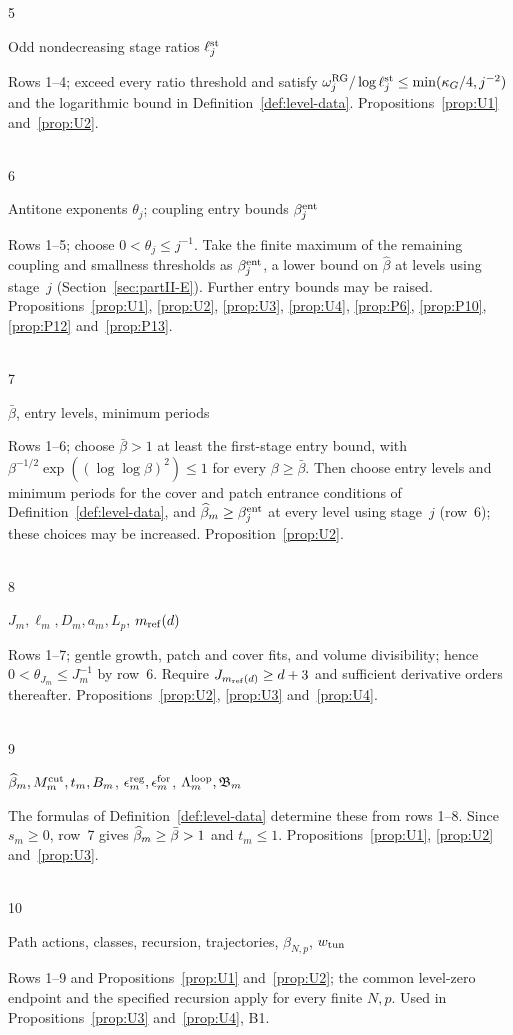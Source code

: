 \begin{tabbing}
5\>\parbox[t]{0.26\linewidth}{\raggedright Odd nondecreasing stage ratios $\ell_j^{\rm st}$}\>\parbox[t]{0.67\linewidth}{\raggedright Rows 1--4; exceed every ratio threshold and satisfy $\omega_j^{\rm RG}/\log\ell_j^{\rm st}\le\min(\kappa_G/4,j^{-2})$ and the logarithmic bound in Definition~\ref{def:level-data}. Propositions~\ref{prop:U1} and~\ref{prop:U2}.}\\[0.45em]
6\>\parbox[t]{0.26\linewidth}{\raggedright Antitone exponents $\theta_j$; coupling entry bounds $\beta_j^{\rm ent}$}\>\parbox[t]{0.67\linewidth}{\raggedright Rows 1--5; choose $0<\theta_j\le j^{-1}$. Take the finite maximum of the remaining coupling and smallness thresholds as $\beta_j^{\rm ent}$, a lower bound on $\widehat\beta$ at levels using stage~$j$ (Section~\ref{sec:partII-E}). Further entry bounds may be raised. Propositions~\ref{prop:U1}, \ref{prop:U2}, \ref{prop:U3}, \ref{prop:U4}, \ref{prop:P6}, \ref{prop:P10}, \ref{prop:P12} and~\ref{prop:P13}.}\\[0.45em]
7\>\parbox[t]{0.26\linewidth}{\raggedright $\bar\beta$, entry levels, minimum periods}\>\parbox[t]{0.67\linewidth}{\raggedright Rows 1--6; choose $\bar\beta>1$ at least the first-stage entry bound, with $\beta^{-1/2}\exp((\log\log\beta)^2)\le1$ for every $\beta\ge\bar\beta$. Then choose entry levels and minimum periods for the cover and patch entrance conditions of Definition~\ref{def:level-data}, and $\widehat{\beta}_m\ge\beta_j^{\rm ent}$ at every level using stage~$j$ (row~6); these choices may be increased. Proposition~\ref{prop:U2}.}\\[0.45em]
8\>\parbox[t]{0.26\linewidth}{\raggedright $J_m,\ell_m,D_m,a_m,L_p$, $m_{\mathrm{ref}}(d)$}\>\parbox[t]{0.67\linewidth}{\raggedright Rows 1--7; gentle growth, patch and cover fits, and volume divisibility; hence $0<\theta_{J_m}\le J_m^{-1}$ by row~6. Require $J_{m_{\mathrm{ref}}(d)}\ge d+3$ and sufficient derivative orders thereafter. Propositions~\ref{prop:U2}, \ref{prop:U3} and~\ref{prop:U4}.}\\[0.45em]
9\>\parbox[t]{0.26\linewidth}{\raggedright $\widehat{\beta}_m,M^{\mathrm{cut}}_m,t_m,B_m$, $\epsilon_m^{\rm reg},\epsilon_m^{\rm for}$, $\Lambda_m^{\rm loop},\mathfrak B_m$}\>\parbox[t]{0.67\linewidth}{\raggedright The formulas of Definition~\ref{def:level-data} determine these from rows 1--8. Since $s_m\ge0$, row~7 gives $\widehat{\beta}_m\ge\bar\beta>1$ and $t_m\le1$. Propositions~\ref{prop:U1}, \ref{prop:U2} and~\ref{prop:U3}.}\\[0.45em]
10\>\parbox[t]{0.26\linewidth}{\raggedright Path actions, classes, recursion, trajectories, $\beta_{N,p}$, $w_{\rm tun}$}\>\parbox[t]{0.67\linewidth}{\raggedright Rows 1--9 and Propositions~\ref{prop:U1} and~\ref{prop:U2}; the common level-zero endpoint and the specified recursion apply for every finite $N,p$. Used in Propositions~\ref{prop:U3} and~\ref{prop:U4}, B1.}\\[0.45em]

\end{tabbing}
